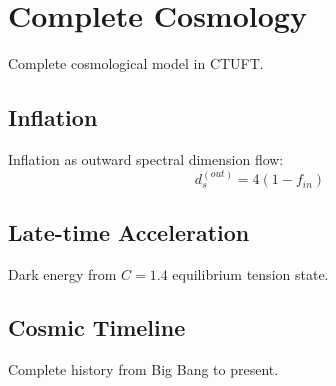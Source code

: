 \section{Complete Cosmology}
\label{sec:cosmology_complete}

Complete cosmological model in CTUFT.

\subsection{Inflation}

Inflation as outward spectral dimension flow:
\begin{equation}
d_s^{(out)} = 4(1 - f_{in})
\end{equation}

\subsection{Late-time Acceleration}

Dark energy from $C = 1.4$ equilibrium tension state.

\subsection{Cosmic Timeline}

Complete history from Big Bang to present.
